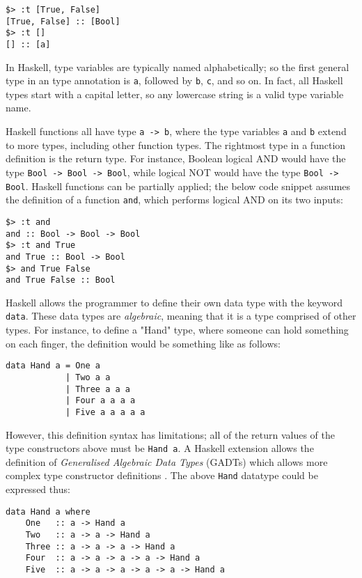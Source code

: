 \documentclass[12pt, a4paper, bibliography=totocnumbered]{scrreprt}
\newcommand{\inline}[1]{\lstinline[basicstyle=\ttfamily\footnotesize]{#1}}
\begin{document}
\begin{lstlisting}
$> :t [True, False]
[True, False] :: [Bool]
$> :t []
[] :: [a]
\end{lstlisting}

In Haskell, type variables are typically named alphabetically; so the first general type in an type annotation is \inline{a}, followed by \inline{b}, \inline{c}, and so on. In fact, all Haskell types start with a capital letter, so any lowercase string is a valid type variable name.

Haskell functions all have type \inline{a -> b}, where the type variables \inline{a} and \inline{b} extend to more types, including other function types. The rightmost type in a function definition is the return type. For instance, Boolean logical AND would have the type \inline{Bool -> Bool -> Bool}, while logical NOT would have the type \inline{Bool -> Bool}. Haskell functions can be partially applied; the below code snippet assumes the definition of a function \inline{and}, which performs logical AND on its two inputs:

\begin{lstlisting}
$> :t and
and :: Bool -> Bool -> Bool
$> :t and True
and True :: Bool -> Bool
$> and True False
and True False :: Bool
\end{lstlisting}

Haskell allows the programmer to define their own data type with the keyword \inline{data}. These data types are \emph{algebraic}, meaning that it is a type comprised of other types. For instance, to define a "Hand" type, where someone can hold something on each finger, the definition would be something like as follows:

\begin{lstlisting}
data Hand a = One a
            | Two a a
            | Three a a a
            | Four a a a a
            | Five a a a a a
\end{lstlisting}

However, this definition syntax has limitations; all of the return values of the type constructors above must be \inline{Hand a}. A Haskell extension allows the definition of \emph{Generalised Algebraic Data Types} (GADTs) which allows more complex type constructor definitions \cite{gadts}. The above \inline{Hand} datatype could be expressed thus:

\begin{lstlisting}
data Hand a where
    One   :: a -> Hand a
    Two   :: a -> a -> Hand a
    Three :: a -> a -> a -> Hand a
    Four  :: a -> a -> a -> a -> Hand a
    Five  :: a -> a -> a -> a -> a -> Hand a
\end{lstlisting}
\end{document}
